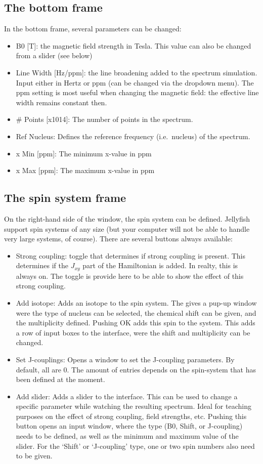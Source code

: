 \documentclass[11pt,a4paper]{article}
\begin{document}
\subsection{The bottom frame}
In the bottom frame, several parameters can be changed:
\begin{itemize}
  \item B0 [T]: the magnetic field strength in Tesla. This value can also be changed from a slider
	 (see below)
  \item Line Width [Hz/ppm]: the line broadening added to the spectrum simulation. Input either in
	 Hertz or ppm (can be changed via the dropdown menu). The ppm setting is most useful when
	 changing the magnetic field: the effective line width remains constant then.
  \item \# Points [x1014]: The number of points in the spectrum.
  \item Ref Nucleus: Defines the reference frequency (i.e.\ nucleus) of the spectrum.
  \item x Min [ppm]: The minimum x-value in ppm
  \item x Max [ppm]: The maximum x-value in ppm
\end{itemize}

\subsection{The spin system frame}
On the right-hand side of the window, the spin system can be defined. Jellyfish support spin
systems of any size (but your computer will not be able to handle very large systems, of course).
There are several buttons always available:
\begin{itemize}
  \item Strong coupling: toggle that determines if strong coupling is present. This determines if
	 the $J_{xy}$ part of the Hamiltonian is added. In realty, this is always on. The toggle is
	 provide here to be able to show the effect of this strong coupling.
  \item Add isotope: Adds an isotope to the spin system. The gives a pup-up window were the type of
	 nucleus can be selected, the chemical shift can be given, and the multiplicity defined. Pushing
	 OK adds this spin to the system. This adds a row of input boxes to the interface, were the shift
	 and multiplicity can be changed.
  \item Set J-couplings: Opens a window to set the J-coupling parameters. By default, all are 0. The
	 amount of entries depends on the spin-system that has been defined at the moment.
  \item Add slider: Adds a slider to the interface. This can be used to change a specific parameter
	 while watching the resulting spectrum. Ideal for teaching purposes on the effect of strong
	 coupling, field strengths, etc. Pushing this button opens an input window, where the type (B0,
	 Shift, or J-coupling) needs to be defined, as well as the minimum and maximum value of the
	 slider. For the `Shift' or `J-coupling' type, one or two spin numbers also need to be given.
\end{itemize}
\end{document}
